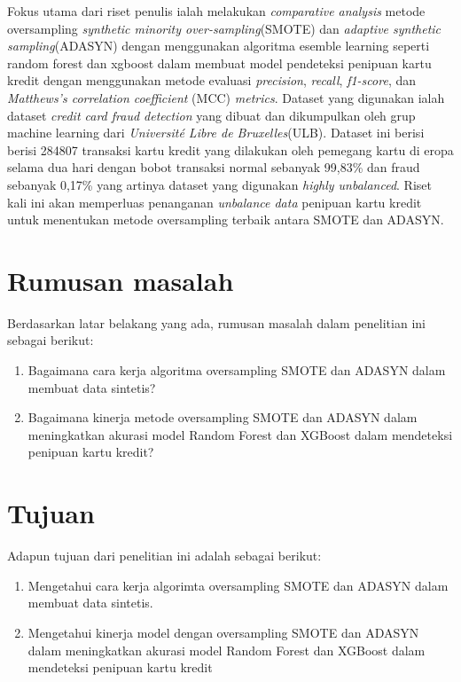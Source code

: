 Fokus utama dari riset penulis ialah melakukan \textit{comparative analysis} metode oversampling \textit{synthetic minority over-sampling}(SMOTE) dan \textit{adaptive synthetic sampling}(ADASYN) dengan menggunakan algoritma esemble learning seperti random forest dan xgboost dalam membuat model pendeteksi penipuan kartu kredit dengan menggunakan metode evaluasi \textit{precision}, \textit{recall}, \textit{f1-score}, dan \textit{Matthews’s correlation coefficient} (MCC) \textit{metrics}. Dataset yang digunakan ialah dataset \textit{credit card fraud detection} yang dibuat dan dikumpulkan oleh grup machine learning dari \textit{Université Libre de Bruxelles}(ULB)\cite{dal2015calibrating}. Dataset ini berisi berisi 284807 transaksi kartu kredit yang dilakukan oleh pemegang kartu di  eropa  selama  dua  hari  dengan bobot  transaksi  normal  sebanyak  99,83\%  dan  fraud  sebanyak  0,17\% yang artinya dataset yang digunakan \textit{highly unbalanced}\cite{WinNT}. Riset kali ini akan memperluas penanganan \textit{unbalance data} penipuan kartu kredit untuk menentukan metode oversampling terbaik antara SMOTE dan ADASYN.

\section{Rumusan masalah} \label{I.Rumusan Masalah}
Berdasarkan latar belakang yang ada, rumusan masalah dalam penelitian ini sebagai berikut:

\begin{enumerate}[noitemsep]
        \item Bagaimana cara kerja algoritma oversampling SMOTE dan ADASYN dalam membuat data sintetis?
        \item Bagaimana kinerja metode oversampling SMOTE dan ADASYN dalam meningkatkan akurasi model Random Forest dan XGBoost dalam mendeteksi penipuan kartu kredit?
\end{enumerate}

\section{Tujuan} \label{I.Tujuan}
Adapun tujuan dari penelitian ini adalah sebagai berikut:
\begin{enumerate}[noitemsep]
        \item Mengetahui cara kerja algorimta oversampling SMOTE dan ADASYN dalam membuat data sintetis.
        \item Mengetahui kinerja model dengan oversampling SMOTE dan ADASYN dalam meningkatkan akurasi model Random Forest dan XGBoost dalam mendeteksi penipuan kartu kredit
\end{enumerate}

